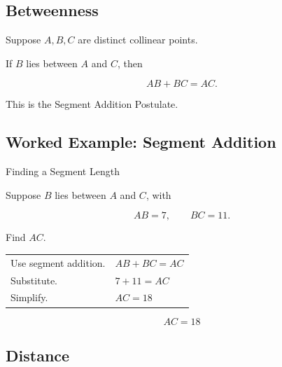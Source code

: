 \subsection{Betweenness}
\label{subsec:betweenness}

Suppose \(A,B,C\) are distinct collinear points.

If \(B\) lies between \(A\) and \(C\), then

\[ AB+BC=AC. \]

This is the Segment Addition Postulate.

\begin{centereddiagram}
\end{centereddiagram}

\subsection{Worked Example: Segment Addition}
\label{subsec:worked-segment-addition}

\begin{workedexamplebox}{Finding a Segment Length}

Suppose \(B\) lies between \(A\) and \(C\), with

\[ AB=7,\qquad BC=11. \]

Find \(AC\).

\begin{tabularx}{\textwidth}{@{}>{\raggedright\arraybackslash}p{}X@{}}
Use segment addition. & \(AB+BC=AC\)\\
Substitute. & \(7+11=AC\)\\
Simplify. & \(AC=18\)
\end{tabularx}

\begin{answerbox}
\[ \boxed{AC=18} \]
\end{answerbox}
\end{workedexamplebox}

\subsection{Distance}
\label{subsec:euclidean-distance}

